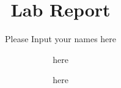 \documentclass[runningheads]{llncs}
\begin{document}
\title{Lab Report}

\author{Please Input your names here \and
  here \and
  here
}

\email{}
\url{}

\maketitle






\end{document}
